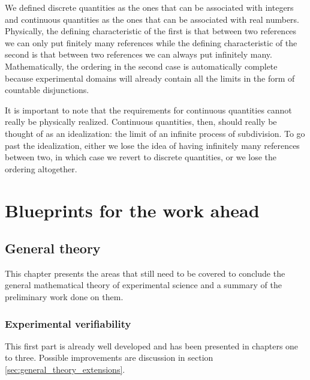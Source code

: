 \documentclass[11pt,letterpaper,fleqn]{memoir} %
\begin{document}
We defined discrete quantities as the ones that can be associated with integers and continuous quantities as the ones that can be associated with real numbers. Physically, the defining characteristic of the first is that between two references we can only put finitely many references while the defining characteristic of the second is that between two references we can always put infinitely many. Mathematically, the ordering in the second case is automatically complete because experimental domains will already contain all the limits in the form of countable disjunctions.

It is important to note that the requirements for continuous quantities cannot really be physically realized. Continuous quantities, then, should really be thought of as an idealization: the limit of an infinite process of subdivision. To go past the idealization, either we lose the idea of having infinitely many references between two, in which case we revert to discrete quantities, or we lose the ordering altogether.

\part{Blueprints for the work ahead}


\def\eqgran{\doteq}
\def\finer{\leqdot}
\def\nfiner{\nleqdot}
\def\coarser{\geqdot}
\def\ncoarser{\ngeqdot}
\def\sfiner{\lessdot}
\def\scoarser{\gtrdot}

\chapter{General theory}

This chapter presents the areas that still need to be covered to conclude the general mathematical theory of experimental science and a summary of the preliminary work done on them.

\section{Experimental verifiability}

This first part is already well developed and has been presented in chapters one to three. Possible improvements are discussion in section \ref{sec:general_theory_extensions}.

\end{document}
